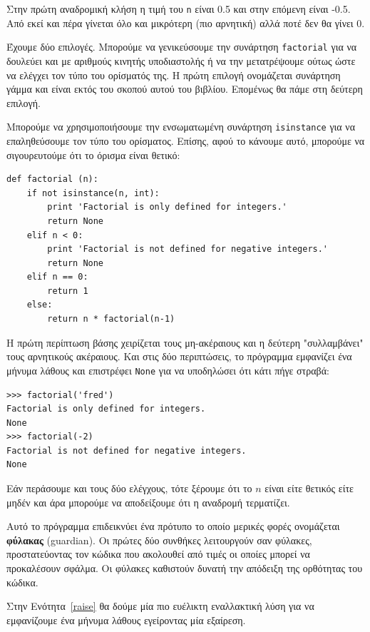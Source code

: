 \documentclass[10pt]{book}
\begin{document}
Στην πρώτη αναδρομική κλήση η τιμή του {\tt n} είναι 
0.5 και στην επόμενη είναι -0.5. Από εκεί και πέρα
γίνεται όλο και μικρότερη (πιο αρνητική) αλλά ποτέ δεν θα γίνει 0.

Έχουμε δύο επιλογές. Μπορούμε να γενικεύσουμε την συνάρτηση 
{\tt factorial} για να δουλεύει και με αριθμούς κινητής υποδιαστολής
ή να την μετατρέψουμε ούτως ώστε να ελέγχει τον τύπο του ορίσματός της.
Η πρώτη επιλογή ονομάζεται συνάρτηση γάμμα και είναι εκτός του σκοπού
αυτού του βιβλίου. Επομένως θα πάμε στη δεύτερη επιλογή.

Μπορούμε να χρησιμοποιήσουμε την ενσωματωμένη συνάρτηση {\tt isinstance} 
για να επαληθεύσουμε τον τύπο του ορίσματος. Επίσης, αφού το κάνουμε αυτό, μπορούμε να σιγουρευτούμε ότι το όρισμα είναι θετικό:

\begin{verbatim}
def factorial (n):
    if not isinstance(n, int):
        print 'Factorial is only defined for integers.'
        return None
    elif n < 0:
        print 'Factorial is not defined for negative integers.'
        return None
    elif n == 0:
        return 1
    else:
        return n * factorial(n-1)
\end{verbatim}
%

Η πρώτη περίπτωση βάσης χειρίζεται τους μη-ακέραιους και η δεύτερη 
"συλλαμβάνει" τους αρνητικούς ακέραιους. Και στις δύο περιπτώσεις,
το πρόγραμμα εμφανίζει ένα μήνυμα λάθους και επιστρέφει 
{\tt None} για να υποδηλώσει ότι κάτι πήγε στραβά:

\begin{verbatim}
>>> factorial('fred')
Factorial is only defined for integers.
None
>>> factorial(-2)
Factorial is not defined for negative integers.
None
\end{verbatim}
%

Εάν περάσουμε και τους δύο ελέγχους, τότε ξέρουμε ότι το $n$ 
είναι είτε θετικός είτε μηδέν και άρα μπορούμε να αποδείξουμε ότι η αναδρομή
τερματίζει.

Αυτό το πρόγραμμα επιδεικνύει ένα πρότυπο το οποίο μερικές φορές ονομάζεται
{\bf φύλακας} (guardian). Οι πρώτες δύο συνθήκες λειτουργούν σαν φύλακες,
προστατεύοντας τον κώδικα που ακολουθεί από τιμές οι οποίες μπορεί να προκαλέσουν σφάλμα. Οι φύλακες καθιστούν δυνατή την απόδειξη της ορθότητας του κώδικα.

Στην Ενότητα~\ref{raise} θα δούμε μία πιο ευέλικτη εναλλακτική λύση
για να εμφανίζουμε ένα μήνυμα λάθους εγείροντας μία εξαίρεση.
\end{document}
